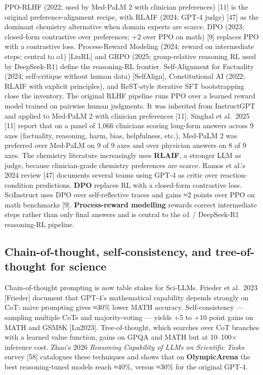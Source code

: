 PPO-RLHF (2022; used by Med-PaLM 2 with clinician preferences) {[}11{]} is the original preference-alignment recipe, with RLAIF (2024; GPT-4 judge) {[}47{]} as the dominant chemistry alternative when domain experts are scarce. DPO (2023; closed-form contrastive over preferences; +2 over PPO on math) {[}9{]} replaces PPO with a contrastive loss. Process-Reward Modeling (2024; reward on intermediate steps; central to o1) {[}LiuRL{]} and GRPO (2025; group-relative reasoning RL used by DeepSeek-R1) define the reasoning-RL frontier. Self-Alignment for Factuality (2024; self-critique without human data) {[}SelfAlign{]}, Constitutional AI (2022; RLAIF with explicit principles), and ReST-style iterative SFT bootstrapping close the inventory. The original RLHF pipeline runs PPO over a learned reward model trained on pairwise human judgments. It was inherited from InstructGPT and applied to Med-PaLM 2 with clinician preferences {[}11{]}. Singhal et al.~2025 {[}11{]} report that on a panel of 1,066 clinicians scoring long-form answers across 9 axes (factuality, reasoning, harm, bias, helpfulness, etc.), Med-PaLM 2 was preferred over Med-PaLM on 9 of 9 axes and over physician answers on 8 of 9 axes. The chemistry literature increasingly uses \textbf{RLAIF}, a stronger LLM as judge, because clinician-grade chemistry preferences are scarce. Ramos et al.'s 2024 review {[}47{]} documents several teams using GPT-4 as critic over reaction-condition predictions. \textbf{DPO} replaces RL with a closed-form contrastive loss. SciInstruct uses DPO over self-reflective traces and gains ≈2 points over PPO on math benchmarks {[}9{]}. \textbf{Process-reward modelling} rewards correct intermediate steps rather than only final answers and is central to the o1 / DeepSeek-R1 reasoning-RL pipeline.

\subsection{Chain-of-thought, self-consistency, and tree-of-thought for science}\label{chain-of-thought-self-consistency-and-tree-of-thought-for-science}

Chain-of-thought prompting is now table stakes for Sci-LLMs. Frieder et al.~2023 {[}Frieder{]} document that GPT-4's mathematical capability depends strongly on CoT: naive prompting gives ≈30\% lower MATH accuracy. Self-consistency --- sampling multiple CoTs and majority-voting --- yields +5 to +10 point gains on MATH and GSM8K {[}Lu2023{]}. Tree-of-thought, which searches over CoT branches with a learned value function, gains on GPQA and MATH but at 10--100× inference cost. Zhao's 2026 \emph{Reasoning Capability of LLMs on Scientific Tasks} survey {[}58{]} catalogues these techniques and shows that on \textbf{OlympicArena} the best reasoning-tuned models reach ≈40\%, versus ≈30\% for the original GPT-4.

